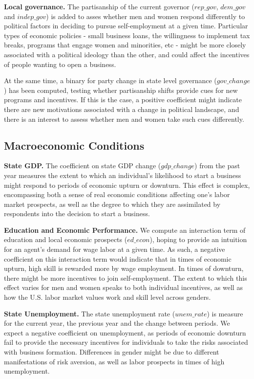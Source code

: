 \textbf{Local governance.} The partisanship of the current governor ($rep\_gov$, $dem\_gov$ and $indep\_gov$) is added to asses whether men and women respond differently to political factors in deciding to pursue self-employment at a given time. Particular types of economic policies - small business loans, the willingness to implement tax breaks, programs that engage women and minorities, etc - might be more closely associated with a political ideology than the other, and could affect the incentives of people wanting to open a business. 

At the same time, a binary for party change in state level governance ($gov\_change$) has been computed, testing whether partisanship shifts provide cues for new programs and incentives. If this is the case, a positive coefficient might indicate there are new motivations associated with a change in political landscape, and there is an interest to assess whether men and women take such cues differently. 


\subsection{Macroeconomic Conditions}

\textbf{State GDP.} The coefficient on state GDP change ($gdp\_change$) from the past year measures the extent to which an individual's likelihood to start a business might respond to periods of economic upturn or downturn. This effect is complex, encompassing both a sense of real economic conditions affecting one's labor market prospects, as well as the degree to which they are assimilated by respondents into the decision to start a business.

\textbf{Education and Economic Performance.} We compute an interaction term of education and local economic prospects ($ed\_econ$), hoping to provide an intuition for an agent's demand for wage labor at a given time. As such, a negative coefficient on this interaction term would indicate that in times of economic upturn, high skill is rewarded more by wage employment. In times of downturn, there might be more incentives to join self-employment. The extent to which this effect varies for men and women speaks to both individual incentives, as well as how the U.S. labor market values work and skill level across genders. 

\textbf{State Unemployment.} The state unemployment rate ($unem\_rate$) is measure for the current year, the previous year and the change between periods. We expect a negative coefficient on unemployment, as periods of economic downturn fail to provide the necessary incentives for individuals to take the risks associated with business formation. Differences in gender might be due to different manifestations of risk aversion, as well as labor prospects in times of high unemployment. \\

